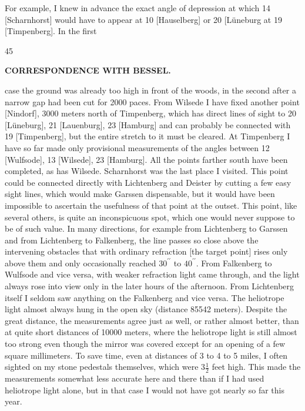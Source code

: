 For example, I knew in advance the exact angle of depression at which 14 [Scharnhorst] would have to appear at 10 [Hauselberg] or 20 [Lüneburg at 19 [Timpenberg]. In the first
\par\smallskip{}\hfill{\footnotesize45}\par
\clearpage
{}\hfill{\small\textbf{CORRESPONDENCE WITH BESSEL.}}\par\medskip
\noindent case the ground was already too high in front of the woods, in the second after a narrow gap had been cut for 2000 paces.
From Wilsede I have fixed another point [Nindorf], 3000 meters north of Timpenberg, which has direct lines of sight to 20 [Lüneburg], 21 [Lauenburg], 23 [Hamburg] and can probably be connected with 19 [Timpenberg], but the entire stretch to it must be cleared.
At Timpenberg I have so far made only provisional measurements of the angles between 12 [Wulfsode], 13 [Wilsede], 23 [Hamburg]. All the points farther south have been completed, as has Wilsede.
Scharnhorst was the last place I visited. This point could be connected directly with Lichtenberg and Deister by cutting a few easy sight lines, which would make Garssen dispensable, but it would have been impossible to ascertain the usefulness of that point at the outset.
This point, like several others, is quite an inconspicuous spot, which one would never suppose to be of such value.
In many directions, for example from Lichtenberg to Garssen and from Lichtenberg to Falkenberg, the line passes so close above the intervening obstacles that with ordinary refraction [the target point] rises only  above them and only occasionally reached \(30^{\prime\prime}\) to \(40^{\prime\prime}\). From Falkenberg to Wulfsode and vice versa, with weaker refraction  light came through, and the light always rose into view only in the later hours of the afternoon.
From Lichtenberg itself I seldom saw anything on the Falkenberg and vice versa. The heliotrope light almost always hung in the open sky (distance 85542 meters). Despite the great distance, the measurements agree just as well, or rather almost better, than at quite short distances of 10000 meters, where the heliotrope light is still almost too strong even though the mirror was covered except for an opening of a few square millimeters.
To save time, even at distances of 3 to 4 to 5 miles, I often sighted on my stone pedestals themselves, which were \(3\frac{1}{2}\) feet high.
This made the measurements somewhat less accurate here and there than if I had used heliotrope light alone, but in that case I would not have got nearly so far this year.
